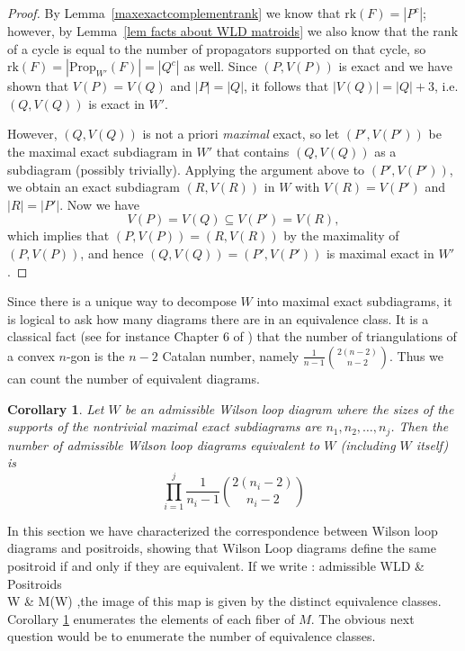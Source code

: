\documentclass[11pt]{article}
\newcommand{\rk}{\textrm{rk} }
\def\bas #1\eas{\begin{align*} #1 \end{align*}}
\newcommand{\Prop}{\textrm{Prop}}
\newtheorem{cor}[thm]{Corollary}
\theoremstyle{remark}
\theoremstyle{definition}
\begin{document}
\begin{proof}
By Lemma~\ref{maxexactcomplementrank} we know that $\rk(F) = |P^c|$; however, by Lemma~\ref{lem facts about WLD matroids} we also know that the rank of a cycle is equal to the number of propagators supported on that cycle, so $\rk(F) = |\Prop_{W'}(F)| = |Q^c|$ as well. Since $(P,V(P))$ is exact and we have shown that $V(P) = V(Q)$ and $|P| = |Q|$, it follows that $|V(Q)| = |Q| + 3$, i.e.  $(Q,V(Q))$ is exact in $W'$.

However, $(Q,V(Q))$ is not a priori {\em maximal} exact, so let $(P',V(P'))$ be the maximal exact subdiagram in $W'$ that contains $(Q,V(Q))$ as a subdiagram (possibly trivially). Applying the argument above to $(P',V(P'))$, we obtain an exact subdiagram $(R,V(R))$ in $W$ with $V(R) = V(P')$ and $|R| = |P'|$. Now we have
\[V(P) = V(Q) \subseteq V(P') = V(R),\]
which implies that $(P,V(P)) = (R,V(R))$ by the maximality of $(P,V(P))$, and hence $(Q,V(Q)) = (P',V(P'))$ is maximal exact in $W'$.
\end{proof}


Since there is a unique way to decompose $W$ into maximal exact subdiagrams, it is logical to ask how many diagrams there are in an equivalence class. It is a classical fact (see for instance Chapter 6 of \cite{Stanley}) that the number of triangulations of a convex $n$-gon is the $n-2$ Catalan number, namely $\frac{1}{n-1}\binom{2(n-2)}{n-2}$.  Thus we can count the number of equivalent diagrams.

\begin{cor}\label{number of equiv diagrams}
  Let $W$ be an admissible Wilson loop diagram where the sizes of the supports of the nontrivial maximal exact subdiagrams are $n_1, n_2, \ldots, n_j$.  Then the number of admissible Wilson loop diagrams equivalent to $W$ (including $W$ itself) is
  \[
  \prod_{i=1}^{j} \frac{1}{n_i-1}\binom{2(n_i-2)}{n_i-2}
  \]
\end{cor}

In this section we have characterized the correspondence between Wilson loop diagrams and positroids, showing that Wilson Loop diagrams define the same positroid if and only if they are equivalent. If we write \bas M: \textrm{admissible WLD} & \longrightarrow \textrm{Positroids} \\ W & \mapsto M(W) \;,\eas the image of this map is given by the distinct equivalence classes. Corollary \ref{number of equiv diagrams} enumerates the elements of each fiber of $M$.  The obvious next question would be to enumerate the number of equivalence classes. 
\end{document}
